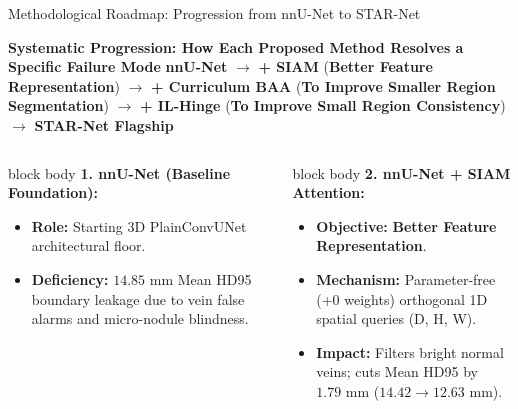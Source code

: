 \documentclass[aspectratio=169, 10pt]{beamer}
\begin{document}
\begin{frame}{Methodological Roadmap: Progression from nnU-Net to STAR-Net}
  \begin{block}{\small \textbf{Systematic Progression: How Each Proposed Method Resolves a Specific Failure Mode}}
    \scriptsize \centering
    \textbf{nnU-Net} $\rightarrow$ \textbf{+ SIAM} (\textbf{Better Feature Representation}) $\rightarrow$ \textbf{+ Curriculum BAA} (\textbf{To Improve Smaller Region Segmentation}) $\rightarrow$ \textbf{+ IL-Hinge} (\textbf{To Improve Small Region Consistency}) $\rightarrow$ \textbf{STAR-Net Flagship}
  \end{block}
  
  \vspace{0.08cm}
  \begin{columns}[T]
    \begin{beamercolorbox}[rounded=true,shadow=false,sep=4pt]{block body}
      \textbf{\small 1. nnU-Net (Baseline Foundation):}
      \begin{itemize}\itemsep=2pt
        \scriptsize
        \item \textbf{Role:} Starting 3D PlainConvUNet architectural floor.
        \item \textbf{Deficiency:} $14.85\text{ mm}$ Mean HD95 boundary leakage due to vein false alarms and micro-nodule blindness.
      \end{itemize}
    \end{beamercolorbox}
    
    \vspace{0.10cm}
    \begin{beamercolorbox}[rounded=true,shadow=false,sep=4pt]{block body}
      \textbf{\small 2. nnU-Net + SIAM Attention:}
      \begin{itemize}\itemsep=2pt
        \scriptsize
        \item \textbf{Objective:} \textbf{Better Feature Representation}.
        \item \textbf{Mechanism:} Parameter-free (+0 weights) orthogonal 1D spatial queries (D, H, W).
        \item \textbf{Impact:} Filters bright normal veins; cuts Mean HD95 by $1.79\text{ mm}$ ($14.42 \rightarrow 12.63\text{ mm}$).
      \end{itemize}
    \end{beamercolorbox}
    

\end{columns}
\end{frame}
\end{document}
